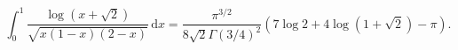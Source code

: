%

\begin{problem}[pytanie 570997]
    \label{stack_570997}%
    \begin{equation}
        \int_0^1 \frac{\log (x + \sqrt 2)}{\sqrt{x(1-x)(2-x)}} \,\mathrm{d}x = \frac{\pi^{3/2}}{8\sqrt{2} \Gamma(3/4)^2 } \left(7 \log 2 + 4 \log (1 + \sqrt 2) - \pi \right).
    \end{equation}
\end{problem}

%